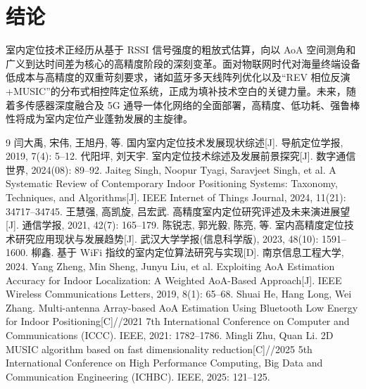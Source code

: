 \documentclass[UTF8,a4paper,12pt]{ctexart}
\begin{document}
\section{结论}
室内定位技术正经历从基于 RSSI 信号强度的粗放式估算，向以 AoA 空间测角和广义到达时间差为核心的高精度阶段的深刻变革。面对物联网时代对海量终端设备低成本与高精度的双重苛刻要求，诸如蓝牙多天线阵列优化以及“REV 相位反演+MUSIC”的分布式相控阵定位系统，正成为填补技术空白的关键力量。未来，随着多传感器深度融合及 5G 通导一体化网络的全面部署，高精度、低功耗、强鲁棒性将成为室内定位产业蓬勃发展的主旋律。

\begin{thebibliography}{9}
 闫大禹, 宋伟, 王旭丹, 等. 国内室内定位技术发展现状综述[J]. 导航定位学报, 2019, 7(4): 5--12.
 代阳坪, 刘天宇. 室内定位技术综述及发展前景探究[J]. 数字通信世界, 2024(08): 89--92.
 Jaiteg Singh, Noopur Tyagi, Saravjeet Singh, et al. A Systematic Review of Contemporary Indoor Positioning Systems: Taxonomy, Techniques, and Algorithms[J]. IEEE Internet of Things Journal, 2024, 11(21): 34717--34745.
 王慧强, 高凯旋, 吕宏武. 高精度室内定位研究评述及未来演进展望[J]. 通信学报, 2021, 42(7): 165--179.
 陈锐志, 郭光毅, 陈亮, 等. 室内高精度定位技术研究应用现状与发展趋势[J]. 武汉大学学报(信息科学版), 2023, 48(10): 1591--1600.
 柳鑫. 基于 WiFi 指纹的室内定位算法研究与实现[D]. 南京信息工程大学, 2024.
 Yang Zheng, Min Sheng, Junyu Liu, et al. Exploiting AoA Estimation Accuracy for Indoor Localization: A Weighted AoA-Based Approach[J]. IEEE Wireless Communications Letters, 2019, 8(1): 65--68.
 Shuai He, Hang Long, Wei Zhang. Multi-antenna Array-based AoA Estimation Using Bluetooth Low Energy for Indoor Positioning[C]//2021 7th International Conference on Computer and Communications (ICCC). IEEE, 2021: 1782--1786.
 Mingli Zhu, Quan Li. 2D MUSIC algorithm based on fast dimensionality reduction[C]//2025 5th International Conference on High Performance Computing, Big Data and Communication Engineering (ICHBC). IEEE, 2025: 121--125.
\end{thebibliography}
\end{document}
